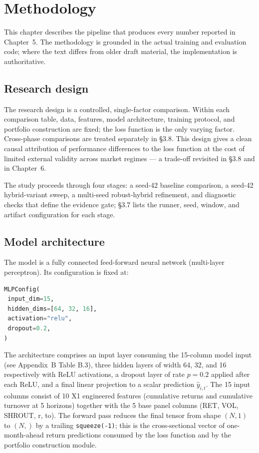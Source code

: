 \chapter{Methodology}

\label{ch:methodology}

This chapter describes the pipeline that produces every number reported in Chapter~5. The methodology is grounded in the actual training and evaluation code; where the text differs from older draft material, the implementation is authoritative.

\section{Research design}

\label{sec:research-design}

The research design is a controlled, single-factor comparison. Within each comparison table, data, features, model architecture, training protocol, and portfolio construction are fixed; the loss function is the only varying factor. Cross-phase comparisons are treated separately in \S3.8. This design gives a clean causal attribution of performance differences to the loss function at the cost of limited external validity across market regimes --- a trade-off revisited in \S3.8 and in Chapter~6.

The study proceeds through four stages: a seed-42 baseline comparison, a seed-42 hybrid-variant sweep, a multi-seed robust-hybrid refinement, and diagnostic checks that define the evidence gate; \S3.7 lists the runner, seed, window, and artifact configuration for each stage.

\section{Model architecture}

\label{sec:model-architecture}

The model is a fully connected feed-forward neural network (multi-layer perceptron). Its configuration is fixed at:

\begin{lstlisting}[language=Python]
MLPConfig(
 input_dim=15,
 hidden_dims=[64, 32, 16],
 activation="relu",
 dropout=0.2,
)
\end{lstlisting}

The architecture comprises an input layer consuming the 15-column model input (see Appendix~B Table B.3), three hidden layers of width 64, 32, and 16 respectively with ReLU activations, a dropout layer of rate $p = 0.2$ applied after each ReLU, and a final linear projection to a scalar prediction $\hat y_{i,t}$. The 15 input columns consist of 10 X1 engineered features (cumulative returns and cumulative turnover at 5 horizons) together with the 5 base panel columns (RET, VOL, SHROUT, r, to). The forward pass reduces the final tensor from shape $(N, 1)$ to $(N,)$ by a trailing \texttt{squeeze(-1)}; this is the cross-sectional vector of one-month-ahead return predictions consumed by the loss function and by the portfolio construction module.

